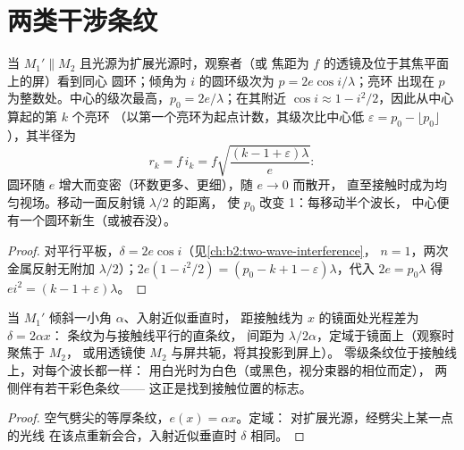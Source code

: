 \section{两类干涉条纹}

\begin{proposition}[空气平板的环]\label{prop:b2:michelson:rings}
当 $M_1' \parallel M_2$ 且光源为扩展光源时，观察者（或
焦距为 $f$ 的透镜及位于其焦平面上的屏）看到同心
圆环；倾角为 $i$ 的圆环级次为 $p = 2e\cos i/\lambda$；亮环
出现在 $p$ 为整数处。中心的级次最高，$p_0 =
2e/\lambda$；在其附近 $\cos i \approx 1 - i^2/2$，因此从中心算起的第 $k$ 个亮环
（以第一个亮环为起点计数，其级次比中心低 $\varepsilon = p_0 - \lfloor p_0\rfloor$
），其半径为
\[
r_k = f\,i_k = f\sqrt{\frac{(k - 1 + \varepsilon)\lambda}e} :
\]
圆环随 $e$ 增大而变密（环数更多、更细），随 $e \to 0$ 而散开，
直至接触时成为均匀视场。移动一面反射镜 $\lambda/2$ 的距离，
使 $p_0$ 改变 1：每移动半个波长，
中心便有一个圆环新生（或被吞没）。
\end{proposition}

\begin{proof}
对平行平板，$\delta = 2e\cos i$（见\cref{ch:b2:two-wave-interference}，
$n = 1$，两次金属反射无附加 $\lambda/2$）；$2e(1 - i^2/2) =
(p_0 - k + 1 - \varepsilon)\lambda$，代入 $2e = p_0\lambda$ 得 $ei^2 = (k - 1 + \varepsilon)\lambda$。
\end{proof}

\begin{proposition}[空气劈尖的条纹]\label{prop:b2:michelson:wedge}
当 $M_1'$ 倾斜一小角 $\alpha$、入射近似垂直时，
距接触线为 $x$ 的镜面处光程差为 $\delta = 2\alpha x$：
条纹为与接触线平行的直条纹，
间距为 $\lambda/2\alpha$，定域于镜面上（观察时聚焦于 $M_2$，
或用透镜使 $M_2$ 与屏共轭，将其投影到屏上）。
零级条纹位于接触线上，对每个波长都一样：
用白光时为白色（或黑色，视分束器的相位而定），
两侧伴有若干彩色条纹——
这正是找到接触位置的标志。
\end{proposition}

\begin{proof}
空气劈尖的等厚条纹，$e(x) = \alpha x$。定域：
对扩展光源，经劈尖上某一点的光线
在该点重新会合，入射近似垂直时 $\delta$ 相同。
\end{proof}

